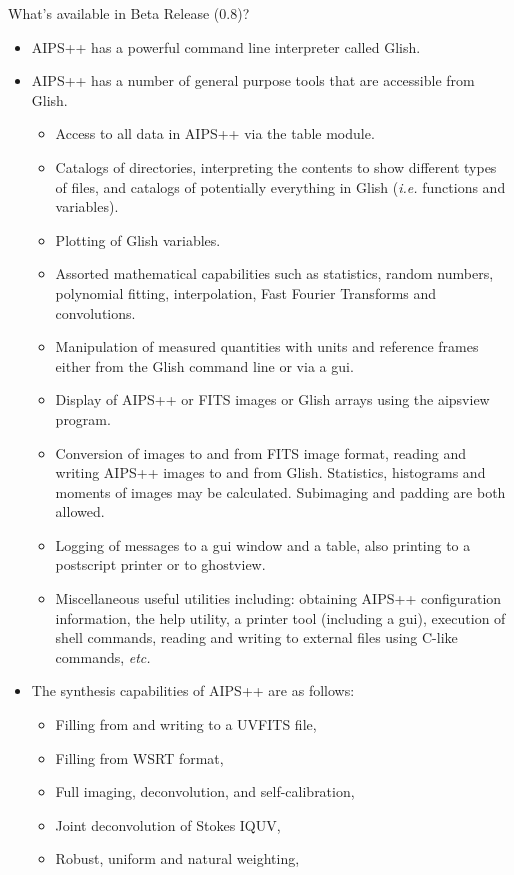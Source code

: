 \begin{slide}{What's available in Beta Release (0.8)?}
\begin{itemize}
\item AIPS++ has a powerful command line interpreter called Glish.
\item AIPS++ has a number of general purpose tools that are accessible
from Glish.
\begin{itemize}
\item Access to all data in AIPS++ via the table module.
\item Catalogs of directories, interpreting the contents to show 
different types of files, and catalogs of potentially everything in Glish
({\em i.e.} functions and variables).
\item Plotting of Glish variables.
\item Assorted mathematical capabilities such as 
statistics, random numbers, polynomial fitting, interpolation,
Fast Fourier Transforms and convolutions.
\item Manipulation of measured quantities with units and reference
frames either from the Glish command line or via a gui.
\item Display of AIPS++ or FITS images or Glish arrays using the
aipsview program.
\item Conversion of images to and from FITS image format, 
reading and writing AIPS++ images to and from Glish. Statistics, histograms and 
moments of images may be calculated. Subimaging and padding are both allowed.
\item Logging of messages to a gui window and a table, also printing
to a postscript printer or to ghostview.
\item Miscellaneous useful utilities including: obtaining AIPS++ 
configuration information, the help utility, 
a printer tool (including a gui), execution of shell commands, reading and 
writing to external files using C-like commands, {\em etc.}
\end{itemize}
\item The synthesis capabilities of AIPS++ are as follows:
\begin{itemize}
\item Filling from and writing to a UVFITS file,
\item Filling from WSRT format,
\item Full imaging, deconvolution, and self-calibration,
\item Joint deconvolution of Stokes IQUV,
\item Robust, uniform and natural weighting,

\end{itemize}
\end{itemize}
\end{slide}

